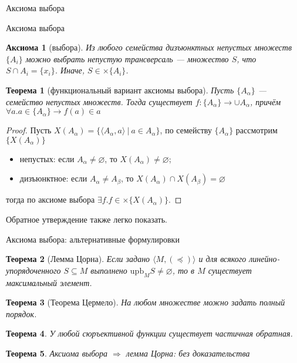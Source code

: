 \documentclass[aspectratio=169]{beamer}
\newtheorem{axm}{Аксиома}[section]
\newtheorem{thm}{Теорема}[section]
\begin{document}
\begin{frame}
\begin{center}\LARGE Аксиома выбора \end{center}
\end{frame}

\begin{frame}{Аксиома выбора}
\begin{axm}[выбора]
Из любого семейства дизъюнктных непустых множеств $\{A_i\}$ можно выбрать непустую трансверсаль --- 
множество $S$, что $S \cap A_i = \{ x_i \}$. Иначе, $S \in \times \{A_i\}$.
\end{axm}

\begin{thm}[функциональный вариант аксиомы выбора]
Пусть $\{A_\alpha\}$ --- семейство непустых множеств. Тогда существует
$f : \{A_\alpha\} \rightarrow \cup A_\alpha$, причём $\forall a.a \in \{A_\alpha\} \rightarrow f(a) \in a$
\end{thm}

\begin{proof}
Пусть $X(A_\alpha) = \{ \langle A_\alpha, a \rangle \ |\ a \in A_\alpha \}$, 
по семейству $\{A_\alpha\}$ рассмотрим $\{X(A_\alpha)\}$
\begin{itemize}
\item непустых: если $A_\alpha \ne \varnothing$, то $X(A_\alpha) \ne \varnothing$;
\item дизъюнктное: если $A_\alpha \ne A_\beta$, то $X(A_\alpha) \cap X(A_\beta) = \varnothing$
\end{itemize}
тогда по аксиоме выбора $\exists f.f \in \times \{ X(A_\alpha) \}$.
\end{proof}
Обратное утверждение также легко показать.
\end{frame}

\begin{frame}{Аксиома выбора: альтернативные формулировки}
\begin{thm}[Лемма Цорна]
Если задано $\langle M, (\preceq) \rangle$ и для всякого линейно-упорядоченного $S \subseteq M$ выполнено
$\text{upb}_M S \ne \varnothing$, то в $M$ существует максимальный элемент.
\end{thm}
\begin{thm}[Теорема Цермело]
На любом множестве можно задать полный порядок.
\end{thm}
\begin{thm}
У любой сюръективной функции существует частичная обратная.
\end{thm}

\begin{thm}
Аксиома выбора $\Rightarrow$ лемма Цорна: без доказательства
\end{thm}
\end{frame}
\end{document}
